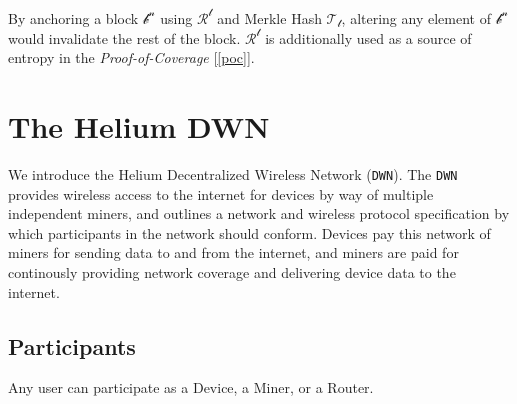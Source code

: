 \documentclass[letterpaper,11pt]{article}
\begin{document}
By anchoring a block $\mathcal{b^n}$ using $\mathcal{R^t}$ and Merkle Hash $\mathcal{T_t}$, altering any element of $\mathcal{b^n}$ would invalidate the rest of the block. $\mathcal{R^t}$ is additionally used as a source of entropy in the \textit{Proof-of-Coverage} [\ref{poc}].

\section{The Helium DWN}

We introduce the Helium Decentralized Wireless Network (\verb|DWN|). The \verb|DWN| provides wireless access to the internet for devices by way of multiple independent miners, and outlines a network and wireless protocol specification by which participants in the network should conform. Devices pay this network of miners for sending data to and from the internet, and miners are paid for continously providing network coverage and delivering device data to the internet.

\subsection{Participants}

Any user can participate as a Device, a Miner, or a Router.
\end{document}
